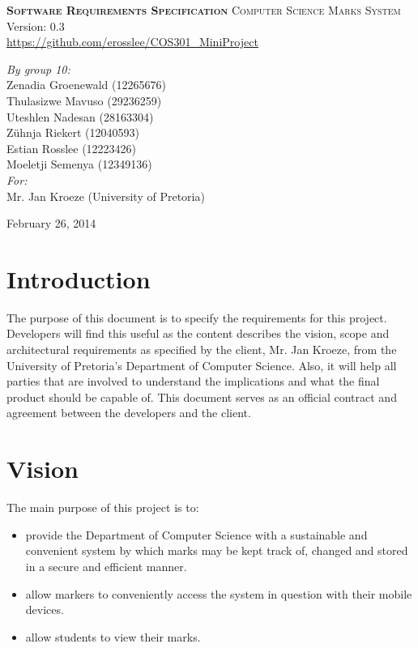 \documentclass[11pt,a4paper]{article}
\begin{document}
\begin{titlepage}
\begin{center}

\textsc{\LARGE \bf{Software Requirements Specification}}
\textsc{\LARGE Computer Science Marks System}\\

\small Version: 0.3\\ \url{https://github.com/erosslee/COS301_MiniProject}

\vspace{0.5cm}
\textit{By group 10:}\\
Zenadia Groenewald (12265676)\\
Thulasizwe Mavuso (29236259)\\
Uteshlen Nadesan (28163304)\\
Z\"uhnja Riekert (12040593)\\
Estian Rosslee (12223426)\\
Moeletji Semenya (12349136)\\

\vspace{0.5cm}
\textit{For:} \\
Mr. Jan Kroeze (University of Pretoria)

\vspace{0.5cm}
February 26, 2014

\end{center}
\end{titlepage}
\newpage

\thispagestyle{empty}
\tableofcontents
\newpage

\setcounter{page}{1}
\pagestyle{plain}
\section{Introduction}
The purpose of this document is to specify the requirements for this project.  Developers will find this useful as the content describes the vision, scope and architectural requirements as specified by the client, Mr. Jan Kroeze, from the University of Pretoria\textquoteright s Department of Computer Science. Also, it will help all parties that are involved to understand the implications and what the final product should be capable of. This document serves as an official contract and agreement between the developers and the client.

\section{Vision}
The main purpose of this project is to:
\begin{itemize}
\item provide the Department of Computer Science with a sustainable and convenient system by which marks may be kept track of, changed and stored in a secure and efficient manner.  
\item allow markers to conveniently access the system in question with their mobile devices. 
\item allow students to view their marks.
\end{itemize}
\end{document}
